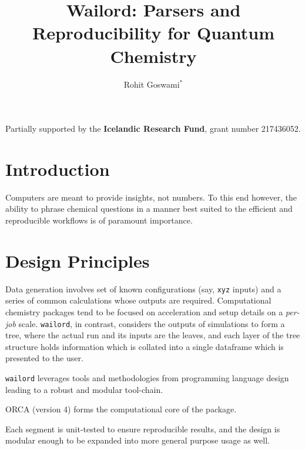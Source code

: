 \documentclass[a0paper,fleqn]{betterposter}
\begin{document}
{{%
\vspace{1em}
Partially supported by the \textbf{Icelandic Research Fund}, grant number 217436052.

}

}{

\title{Wailord: Parsers and Reproducibility for Quantum Chemistry}
\author{Rohit Goswami$^{*}$}

\section{Introduction}
Computers are meant to provide insights, not numbers. To this end however, the
ability to phrase chemical questions in a manner best suited to the efficient
and reproducible workflows is of paramount importance.

\section{Design Principles}

Data generation involves set of known configurations (say, \texttt{xyz} inputs) and a
series of common calculations whose outputs are required. Computational
chemistry packages tend to be focused on acceleration and setup details on a
\textit{per-job} scale. \texttt{wailord}, in contrast, considers the outputs of simulations
to form a tree, where the actual run and its inputs are the leaves, and each
layer of the tree structure holds information which is collated into a single
dataframe which is presented to the user.

\texttt{wailord} leverages tools and methodologies from programming language
design leading to a robust and modular tool-chain.

ORCA (version 4) forms the computational core of the package.

Each segment is unit-tested to ensure reproducible results, and the design is modular enough to be expanded into more general purpose usage as well.

}
\end{document}
